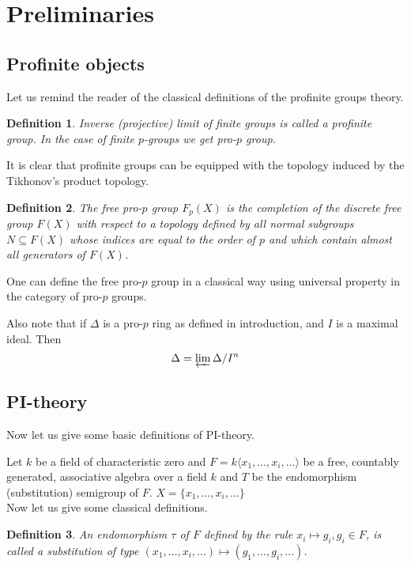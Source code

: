 \documentclass[12pt,a4paper]{article}
\newtheorem{definition}{Definition}[subsection]
\begin{document}
    \section{Preliminaries}

    \subsection{Profinite objects}
    Let us remind the reader of the classical definitions of the profinite groups theory.
    \vskip 0.1in\noindent
    \begin{definition}
        Inverse (projective) limit of finite groups is called a profinite group.
        In the case of finite $p$-groups we get pro-$p$ group.
    \end{definition}
    \vskip 0.1in\noindent
    It is clear that profinite groups can be equipped with the topology induced by the Tikhonov's product topology.

    \vskip 0.1in\noindent
    \begin{definition}
        The free pro-$p$ group $F_p(X)$ is the completion of the discrete free group $F(X)$ with respect to a topology defined by all normal subgroups $N \subseteq F(X)$ whose indices are equal to the order of $p$ and which contain almost all generators of $F(X)$.
    \end{definition}
    \vskip 0.1in\noindent

    One can define the free pro-$p$ group in a classical way using universal property in the category of pro-$p$ groups.

    Also note that if $\Delta$ is a pro-$p$ ring as defined in introduction, and $I$ is a maximal ideal.
    Then
    \[ \Delta = \varprojlim \Delta/I^n \]

    \subsection{PI-theory}
    Now let us give some basic definitions of PI-theory.

    Let $k$ be a field of characteristic zero and $F = k\langle x_1,\ldots,x_i,\ldots\rangle$ be a free, countably generated, associative algebra over a field $k$ and $T$ be the endomorphism (substitution) semigroup of $F$. $X = \{ x_1,\ldots,x_i,\ldots\}$\\
    Now let us give some classical definitions.

    \vskip 0.1in\noindent
    \begin{definition}
        An endomorphism $\tau$ of $F$ defined by the rule $x_i \mapsto g_i, g_i \in F$, is called a substitution of type
        $(x_1,\ldots,x_i,\ldots) \mapsto (g_1,\ldots,g_i,\ldots)$.
    \end{definition}
    \vskip 0.1in\noindent
\end{document}
